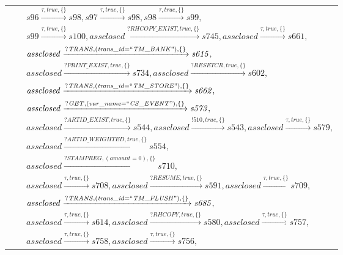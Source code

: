 \begin{tabular}{lcl}
& & $\mathit{s96}\xrightarrow{\mathit{\tau}, \mathit{true}, \{\}}\mathit{s98},\mathit{s97}\xrightarrow{\mathit{\tau}, \mathit{true}, \{\}}\mathit{s98},\mathit{s98}\xrightarrow{\mathit{\tau}, \mathit{true}, \{\}}\mathit{s99},$ \\
& & $\mathit{s99}\xrightarrow{\mathit{\tau}, \mathit{true}, \{\}}\mathit{s100},\mathit{assclosed}\xrightarrow{\mathit{?RHCOPY\_EXIST}, \mathit{true}, \{\}}\mathit{s745},\mathit{assclosed}\xrightarrow{\mathit{\tau}, \mathit{true}, \{\}}\mathit{s661},$ \\
& & $\mathit{assclosed}\xrightarrow{\mathit{?TRANS}, \mathit{(trans\_id = ``TM\_BANK")}, \{\}}\mathit{s615},$ \\
& & $\mathit{assclosed}\xrightarrow{\mathit{?PRINT\_EXIST}, \mathit{true}, \{\}}\mathit{s734},\mathit{assclosed}\xrightarrow{\mathit{?RESETCR}, \mathit{true}, \{\}}\mathit{s602},$ \\
& & $\mathit{assclosed}\xrightarrow{\mathit{?TRANS}, \mathit{(trans\_id = ``TM\_STORE")}, \{\}}\mathit{s662},$ \\
& & $\mathit{assclosed}\xrightarrow{\mathit{?GET}, \mathit{(var\_name = ``CS\_EVENT")}, \{\}}\mathit{s573},$ \\
& & $\mathit{assclosed}\xrightarrow{\mathit{?ARTID\_EXIST}, \mathit{true}, \{\}}\mathit{s544},\mathit{assclosed}\xrightarrow{\mathit{!510}, \mathit{true}, \{\}}\mathit{s543},\mathit{assclosed}\xrightarrow{\mathit{\tau}, \mathit{true}, \{\}}\mathit{s579},$ \\
& & $\mathit{assclosed}\xrightarrow{\mathit{?ARTID\_WEIGHTED}, \mathit{true}, \{\}}\mathit{s554},$ \\
& & $\mathit{assclosed}\xrightarrow{\mathit{?STAMPREG}, \mathit{(amount = 0)}, \{\}}\mathit{s710},$ \\
& & $\mathit{assclosed}\xrightarrow{\mathit{\tau}, \mathit{true}, \{\}}\mathit{s708},\mathit{assclosed}\xrightarrow{\mathit{?RESUME}, \mathit{true}, \{\}}\mathit{s591},\mathit{assclosed}\xrightarrow{\mathit{\tau}, \mathit{true}, \{\}}\mathit{s709},$ \\
& & $\mathit{assclosed}\xrightarrow{\mathit{?TRANS}, \mathit{(trans\_id = ``TM\_FLUSH")}, \{\}}\mathit{s685},$ \\
& & $\mathit{assclosed}\xrightarrow{\mathit{\tau}, \mathit{true}, \{\}}\mathit{s614},\mathit{assclosed}\xrightarrow{\mathit{?RHCOPY}, \mathit{true}, \{\}}\mathit{s580},\mathit{assclosed}\xrightarrow{\mathit{\tau}, \mathit{true}, \{\}}\mathit{s757},$ \\
& & $\mathit{assclosed}\xrightarrow{\mathit{\tau}, \mathit{true}, \{\}}\mathit{s758},\mathit{assclosed}\xrightarrow{\mathit{\tau}, \mathit{true}, \{\}}\mathit{s756},$ \\

\end{tabular}
